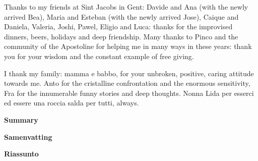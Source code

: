 Thanks to my friends at Sint Jacobs in Gent: Davide and Ana (with the newly arrived Bea), Maria and Esteban (with the newly arrived Jose), Caique and Daniela, Valeria, Joshi, Pawel, Eligio and Luca: thanks for the improvised dinners, beers, holidays and deep friendship.
Many thanks to Pinco and the community of the Apostoline for helping me in many ways in these years: thank you for your wisdom and the constant example of free giving.

I thank my family: mamma e babbo, for your unbroken, positive, caring attitude towards me.
Anto for the cristalline confrontation and the enormous sensitivity, Fra for the innumerable funny stories and deep thoughts. Nonna Lida per esserci ed essere una roccia salda per tutti, always.

\clearpage
\thispagestyle{empty}
\null%
\label{thesis:Summary}
\begin{center}
  {\Large \textbf{Summary}}\\
\end{center}

\clearpage
\thispagestyle{empty}
\null%
\begin{center}
  {\Large \textbf{Samenvatting}}\\
\end{center}

\clearpage
\thispagestyle{empty}
\null%
\begin{center}
  {\Large \textbf{Riassunto}}\\
\end{center}